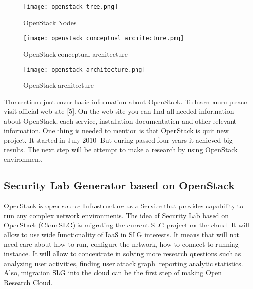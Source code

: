 \begin{figure}[ht!]
\centering
\texttt{[image: openstack\_tree.png]}
\caption{OpenStack Nodes}
\label{overflow}
\end{figure}


\begin{figure}[ht!]
\centering
\texttt{[image: openstack\_conceptual\_architecture.png]}
\caption{OpenStack conceptual architecture}
\label{overflow}
\end{figure}


\begin{figure}[ht!]
\centering
\texttt{[image: openstack\_architecture.png]}
\caption{OpenStack architecture}
\label{overflow}
\end{figure}

The sections just cover basic information about OpenStack. To learn more please visit official web site [5]. On the web site you can find all needed information about OpenStack, each service, installation documentation and other relevant information. One thing is needed to mention is that OpenStack is quit new project. It started in July 2010. But during passed four years it achieved big results. The next step will be attempt to make a research by using OpenStack environment. 


\subsection{Security Lab Generator based on OpenStack}
OpenStack is open source Infrastructure as a Service that provides capability to run any complex network environments. The idea of Security Lab based on OpenStack (CloudSLG) is migrating the current SLG project on the cloud. It will allow to use wide functionality of IaaS in SLG interests. It means that will not need care about how to run, configure the network, how to connect to running instance. It will allow to concentrate in solving more research questions such as analyzing user activities, finding user attack graph, reporting analytic statistics. Also, migration SLG into the cloud can be the first step of making Open Research Cloud.    





% 